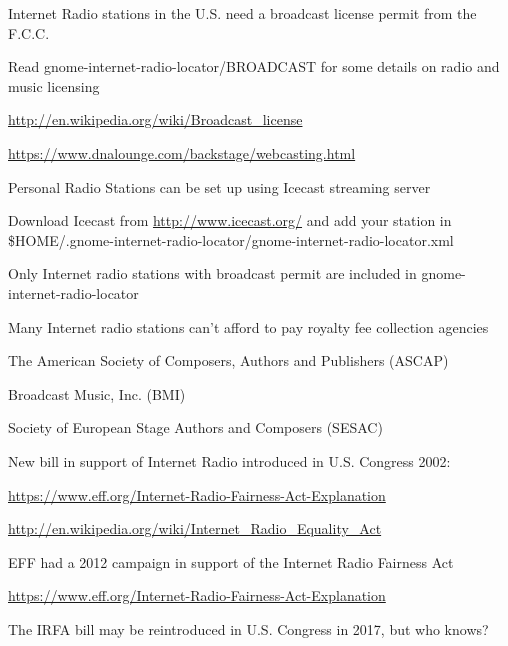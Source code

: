 \documentclass[20pt,landscape]{foils}
\begin{document}

\begin{list1}
  \item Internet Radio stations in the U.S. need a broadcast license permit from the F.C.C.
    \begin{list2}
    \item Read gnome-internet-radio-locator/BROADCAST for some details on radio and music licensing
    \item \url{http://en.wikipedia.org/wiki/Broadcast_license}
    \item \url{https://www.dnalounge.com/backstage/webcasting.html}
    \end{list2}
  \item Personal Radio Stations can be set up using Icecast streaming server
    \begin{list2}
    \item Download Icecast from \url{http://www.icecast.org/} and add your station in \$HOME/.gnome-internet-radio-locator/gnome-internet-radio-locator.xml
    \end{list2}
  \item Only Internet radio stations with broadcast permit are included in gnome-internet-radio-locator
\end{list1}


\begin{list1}
\item Many Internet radio stations can't afford to pay royalty fee collection agencies
  \begin{list2}
  \item The American Society of Composers, Authors and Publishers (ASCAP)
  \item Broadcast Music, Inc. (BMI)
    \item Society of European Stage Authors and Composers (SESAC)
  \end{list2}
  \item New bill in support of Internet Radio introduced in U.S. Congress 2002:
  \begin{list2}
  \item \url{https://www.eff.org/Internet-Radio-Fairness-Act-Explanation}
  \item \url{http://en.wikipedia.org/wiki/Internet_Radio_Equality_Act}
  \end{list2}
\item EFF had a 2012 campaign in support of the Internet Radio Fairness Act
  \begin{list2}
  \item \url{https://www.eff.org/Internet-Radio-Fairness-Act-Explanation}
  \end{list2}
\item The IRFA bill may be reintroduced in U.S. Congress in 2017, but who knows?
\end{list1}
\end{document}
